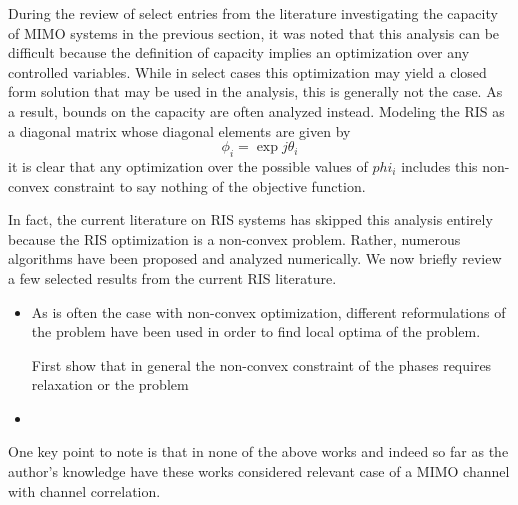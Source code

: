 During the review of select entries from the literature investigating the capacity of MIMO systems in the previous section, it was noted that this analysis can be difficult because the definition of capacity implies an optimization over any controlled variables. 
While in select cases this optimization may yield a closed form solution that may be used in the analysis, this is generally not the case. As a result, bounds on the capacity are often analyzed instead. 
Modeling the RIS as a diagonal matrix whose diagonal elements are given by 
	\begin{equation}
	\phi_i = \exp{j\theta_i}
	\end{equation}
	it is clear that any optimization over the possible values of $phi_i$ includes this non-convex constraint to say nothing of the objective function.

In fact, the current literature on RIS systems has skipped this analysis entirely because the RIS optimization is a non-convex problem. Rather, 
numerous algorithms have been proposed and analyzed numerically. We now briefly review a few selected results from the current RIS literature. 
\par
\begin{itemize}
\item
	
	As is often the case with non-convex optimization, different reformulations of the problem have been used in order to find local optima of the problem.
	

First show that in general the non-convex constraint of the phases requires relaxation or the problem
\item
\end{itemize}
\par
One key point to note is that in none of the above works and indeed so far as the author's knowledge have these works considered relevant case of a MIMO channel with channel correlation. 